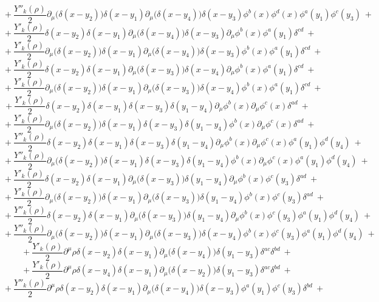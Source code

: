 $$+\ \frac{Y''_k(\rho)}{2}\partial_\mu\big(\delta(x - y_2)\big)\delta(x - y_1)\partial_\mu\big(\delta(x - y_4)\big)\delta(x - y_3)\phi^b(x)\phi^d(x)\phi^a(y_1)\phi^c(y_3) \ +$$
$$+\ \frac{Y'_k(\rho)}{2}\delta(x - y_2)\delta(x - y_1)\partial_\mu\big(\delta(x - y_4)\big)\delta(x - y_3)\partial_\mu\phi^b(x)\phi^a(y_1)\delta^{cd} \ +$$
$$+\ \frac{Y'_k(\rho)}{2}\partial_\mu\big(\delta(x - y_2)\big)\delta(x - y_1)\partial_\mu\big(\delta(x - y_4)\big)\delta(x - y_3)\phi^b(x)\phi^a(y_1)\delta^{cd} \ +$$
$$+\ \frac{Y'_k(\rho)}{2}\delta(x - y_2)\delta(x - y_1)\partial_\mu\big(\delta(x - y_3)\big)\delta(x - y_4)\partial_\mu\phi^b(x)\phi^a(y_1)\delta^{cd} \ +$$
$$+\ \frac{Y'_k(\rho)}{2}\partial_\mu\big(\delta(x - y_2)\big)\delta(x - y_1)\partial_\mu\big(\delta(x - y_3)\big)\delta(x - y_4)\phi^b(x)\phi^a(y_1)\delta^{cd} \ +$$
$$+\ \frac{Y'_k(\rho)}{2}\delta(x - y_2)\delta(x - y_1)\delta(x - y_3)\delta(y_1 - y_4)\partial_\mu\phi^b(x)\partial_\mu\phi^c(x)\delta^{ad} \ +$$
$$+\ \frac{Y'_k(\rho)}{2}\partial_\mu\big(\delta(x - y_2)\big)\delta(x - y_1)\delta(x - y_3)\delta(y_1 - y_4)\phi^b(x)\partial_\mu\phi^c(x)\delta^{ad} \ +$$
$$+\ \frac{Y''_k(\rho)}{2}\delta(x - y_2)\delta(x - y_1)\delta(x - y_3)\delta(y_1 - y_4)\partial_\mu\phi^b(x)\partial_\mu\phi^c(x) \phi^a(y_1) \phi^d(y_4) \ +$$
$$+\ \frac{Y''_k(\rho)}{2}\partial_\mu\big(\delta(x - y_2)\big)\delta(x - y_1)\delta(x - y_3)\delta(y_1 - y_4)\phi^b(x)\partial_\mu\phi^c(x) \phi^a(y_1) \phi^d(y_4) \ +$$
$$+\ \frac{Y'_k(\rho)}{2}\delta(x - y_2)\delta(x - y_1)\partial_\mu\big(\delta(x - y_3)\big)\delta(y_1 - y_4)\partial_\mu\phi^b(x)\phi^c(y_3) \delta^{ad} \ +$$
$$+\ \frac{Y'_k(\rho)}{2}\partial_\mu\big(\delta(x - y_2)\big)\delta(x - y_1)\partial_\mu\big(\delta(x - y_3)\big)\delta(y_1 - y_4)\phi^b(x)\phi^c(y_3) \delta^{ad} \ +$$
$$+\ \frac{Y''_k(\rho)}{2}\delta(x - y_2)\delta(x - y_1)\partial_\mu\big(\delta(x - y_3)\big)\delta(y_1 - y_4)\partial_\mu\phi^b(x)\phi^c(y_3) \phi^a(y_1) \phi^d(y_4)  \ +$$
$$+\ \frac{Y''_k(\rho)}{2}\partial_\mu\big(\delta(x - y_2)\big)\delta(x - y_1)\partial_\mu\big(\delta(x - y_3)\big)\delta(x - y_4)\phi^b(x)\phi^c(y_3) \phi^a(y_1) \phi^d(y_4)  \ +$$
$$+\ \frac{Y'_k(\rho)}{2}\partial^\mu\rho\delta(x - y_2)\delta(x - y_1)\partial_\mu\big(\delta(x - y_4)\big) \delta(y_1 - y_3)\delta^{ac}\delta^{bd} \ +$$
$$+\ \frac{Y'_k(\rho)}{2}\partial^\mu\rho\delta(x - y_4)\delta(x - y_1)\partial_\mu\big(\delta(x - y_2)\big) \delta(y_1 - y_3)\delta^{ac}\delta^{bd} \ +$$
$$+\ \frac{Y''_k(\rho)}{2}\partial^\mu\rho\delta(x - y_2)\delta(x - y_1)\partial_\mu\big(\delta(x - y_4)\big) \delta(x - y_3)\phi^a(y_1)\phi^c(y_3)\delta^{bd} \ +$$
